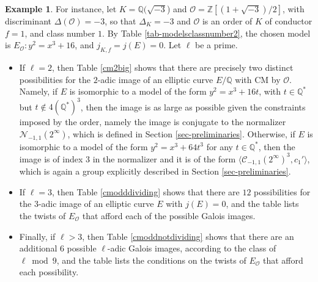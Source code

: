 \documentclass[11pt]{amsart}
\theoremstyle{definition}
\newtheorem{example}[defn]{Example}
\newcommand{\Q}{\mathbb Q}
\newcommand{\Z}{\mathbb Z}
\begin{document}
\begin{example}
For instance, let $K=\Q(\sqrt{-3}$) and $\mathcal{O}=\Z[(1+\sqrt{-3})/2]$, with discriminant $\Delta(\mathcal{O})=-3$, so that $\Delta_K=-3$ and $\mathcal{O}$ is an order of $K$ of conductor $f=1$, and class number $1$. By Table \ref{tab-modelsclassnumber2}, the chosen model is $E_\mathcal{O}: y^2=x^3+16$, and $j_{K,f}=j(E)=0$. Let $\ell$ be a prime. 
\begin{itemize}
    \item If $\ell=2$, then Table \ref{cm2big} shows that there are precisely two distinct possibilities for the $2$-adic image of an elliptic curve $E/\Q$ with CM by $\mathcal{O}$. Namely, if $E$ is isomorphic to a model of the form $y^2=x^3+16t$, with $t\in \Q^\ast$ but $t\not\in 4(\Q^\ast)^3$, then the image is as large as possible given the constraints imposed by the order, namely the image is conjugate to the normalizer $\mathcal{N}_{-1,1}(2^\infty)$, which is defined in Section \ref{sec-preliminaries}. Otherwise, if $E$ is isomorphic to a model of the form $y^2=x^3+64t^3$ for any $t\in \Q^\ast$, then the image is of index $3$ in the normalizer and it is of the form $\langle \mathcal{C}_{-1,1}(2^\infty)^3,c_1'\rangle$, which is again a group explicitly described in Section \ref{sec-preliminaries}.

 \item If $\ell=3$, then Table \ref{cmodddividing} shows that there are $12$ possibilities for the $3$-adic image of an elliptic curve $E$ with $j(E)=0$, and the table lists the twists of $E_\mathcal{O}$ that afford each of the possible Galois images.

\item Finally, if $\ell>3$, then Table \ref{cmoddnotdividing} shows that there are an additional $6$ possible $\ell$-adic Galois images, according to the class of $\ell \bmod 9$, and the table lists the conditions on the twists of $E_\mathcal{O}$ that afford each possibility.

   \end{itemize} 
\end{example}
\end{document}
